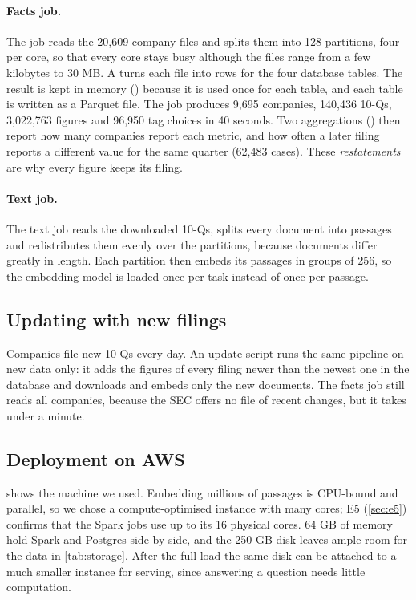 \paragraph{Facts job.} The job reads the 20,609 company files and splits them into 128 partitions,
four per core, so that every core stays busy although the files range from a few kilobytes to 30 MB.
A  turns each file into rows for the four database tables. The result is kept in memory
() because it is used once for each table, and each table is written as a Parquet file.
The job produces 9,695 companies, 140,436 10-Qs, 3,022,763 figures and 96,950 tag choices in 40
seconds. Two aggregations () then report how many companies report each metric, and how
often a later filing reports a different value for the same quarter (62,483 cases). These
\emph{restatements} are why every figure keeps its filing.

\paragraph{Text job.} The text job reads the downloaded 10-Qs, splits every document into passages
and redistributes them evenly over the partitions, because documents differ greatly in length. Each
partition then embeds its passages in groups of 256, so the embedding model is loaded once per task
instead of once per passage.

\subsection{Updating with new filings}
\label{sec:update}

Companies file new 10-Qs every day. An update script runs the same pipeline on new data only: it adds
the figures of every filing newer than the newest one in the database and downloads and embeds only
the new documents. The facts job still reads all companies, because the SEC offers no file of recent
changes, but it takes under a minute.

\subsection{Deployment on AWS}

 shows the machine we used. Embedding millions of passages is CPU-bound and
parallel, so we chose a compute-optimised instance with many cores; E5 (\cref{sec:e5}) confirms that
the Spark jobs use up to its 16 physical cores. 64 GB of memory hold Spark and Postgres side by side,
and the 250 GB disk leaves ample room for the data in \cref{tab:storage}. After the full load the
same disk can be attached to a much smaller instance for serving, since answering a question needs
little computation.

